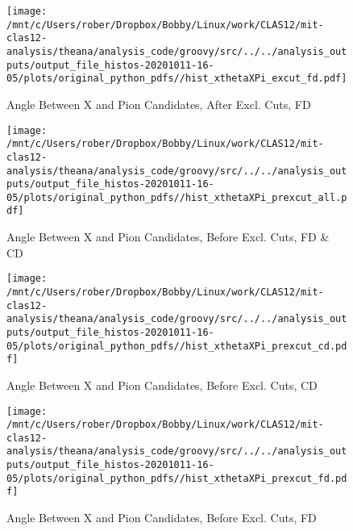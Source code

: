 \documentclass{article}
\begin{document}
\begin{landscape}
    \begin{figure}[h]
        \centering

        \texttt{[image: /mnt/c/Users/rober/Dropbox/Bobby/Linux/work/CLAS12/mit-clas12-analysis/theana/analysis\_code/groovy/src/../../analysis\_outputs/output\_file\_histos-20201011-16-05/plots/original\_python\_pdfs//hist\_xthetaXPi\_excut\_fd.pdf]}
        \captionsetup{textformat=empty,labelformat=blank}
        \caption{Angle Between X and Pion Candidates, After Excl. Cuts, FD}
    \end{figure}
    \clearpage
    
    \begin{figure}[h]
        \centering

        \texttt{[image: /mnt/c/Users/rober/Dropbox/Bobby/Linux/work/CLAS12/mit-clas12-analysis/theana/analysis\_code/groovy/src/../../analysis\_outputs/output\_file\_histos-20201011-16-05/plots/original\_python\_pdfs//hist\_xthetaXPi\_prexcut\_all.pdf]}
        \captionsetup{textformat=empty,labelformat=blank}
        \caption{Angle Between X and Pion Candidates, Before Excl. Cuts, FD \& CD}
    \end{figure}
    \clearpage
    
    \begin{figure}[h]
        \centering

        \texttt{[image: /mnt/c/Users/rober/Dropbox/Bobby/Linux/work/CLAS12/mit-clas12-analysis/theana/analysis\_code/groovy/src/../../analysis\_outputs/output\_file\_histos-20201011-16-05/plots/original\_python\_pdfs//hist\_xthetaXPi\_prexcut\_cd.pdf]}
        \captionsetup{textformat=empty,labelformat=blank}
        \caption{Angle Between X and Pion Candidates, Before Excl. Cuts, CD}
    \end{figure}
    \clearpage
    
    \begin{figure}[h]
        \centering

        \texttt{[image: /mnt/c/Users/rober/Dropbox/Bobby/Linux/work/CLAS12/mit-clas12-analysis/theana/analysis\_code/groovy/src/../../analysis\_outputs/output\_file\_histos-20201011-16-05/plots/original\_python\_pdfs//hist\_xthetaXPi\_prexcut\_fd.pdf]}
        \captionsetup{textformat=empty,labelformat=blank}
        \caption{Angle Between X and Pion Candidates, Before Excl. Cuts, FD}
    \end{figure}
    \clearpage
    
	\end{landscape}
	
\end{document}
